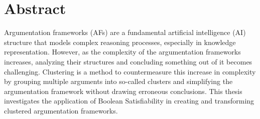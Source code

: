\documentclass[twoside,openright]{scrreprt}
\begin{document}






\thesisdate[ ]{\today}







\printthesistitle

% 


\chapter*{Abstract}
Argumentation frameworks (AFs) are a fundamental artificial intelligence (AI) structure that models complex reasoning processes, especially in knowledge representation. However, as the complexity of the argumentation frameworks increases, analyzing their structures and concluding something out of it becomes challenging. Clustering is a method to countermeasure this increase in complexity by grouping multiple arguments into so-called clusters and simplifying the argumentation framework without drawing erroneous conclusions. This thesis investigates the application of Boolean Satisfiability in creating and transforming clustered argumentation frameworks.
\end{document}
